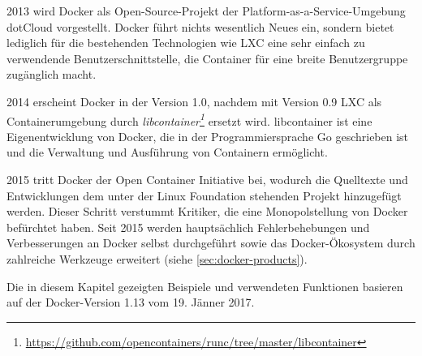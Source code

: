 2013 wird Docker als Open-Source-Projekt der Platform-as-a-Service-Umgebung dotCloud vorgestellt.
Docker führt nichts wesentlich Neues ein, sondern bietet lediglich für die bestehenden Technologien wie LXC eine sehr einfach zu verwendende Benutzerschnittstelle, die Container für eine breite Benutzergruppe zugänglich macht.

2014 erscheint Docker in der Version 1.0, nachdem mit Version 0.9 LXC als Containerumgebung durch \emph{libcontainer\footnote{\url{https://github.com/opencontainers/runc/tree/master/libcontainer}}} ersetzt wird.
libcontainer ist eine Eigenentwicklung von Docker, die in der Programmiersprache Go geschrieben ist und die Verwaltung und Ausführung von Containern ermöglicht.

2015 tritt Docker der Open Container Initiative bei, wodurch die Quelltexte und Entwicklungen dem unter der Linux Foundation stehenden Projekt hinzugefügt werden.
Dieser Schritt verstummt Kritiker, die eine Monopolstellung von Docker befürchtet haben.
Seit 2015 werden hauptsächlich Fehlerbehebungen und Verbesserungen an Docker selbst durchgeführt sowie das Docker-Ökosystem durch zahlreiche Werkzeuge erweitert (siehe \cref{sec:docker-products}).

Die in diesem Kapitel gezeigten Beispiele und verwendeten Funktionen basieren auf der Docker-Version 1.13 vom 19. Jänner 2017.

